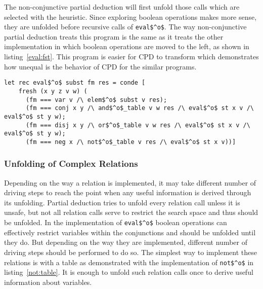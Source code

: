The non-conjunctive partial deduction will first unfold those calls which are selected with the heuristic.
Since exploring boolean operations makes more sense, they are unfolded before recursive calls of \lstinline{eval$^o$}.
The way non-conjunctive partial deduction treats this program is the same as it treats the other implementation in which boolean operations are moved to the left, as shown in listing~\ref{eval:fst}.
This program is easier for CPD to transform which demonstrates how unequal is the behavior of CPD for the similar programs.

\begin{figure*}[!h]
  \centering
  \begin{minipage}{0.85\textwidth}
    \begin{lstlisting}[label={eval:fst}, caption={Evaluator of formulas with boolean operation second}, captionpos=b, frame=tb]
  let rec eval$^o$ subst fm res = conde [
    fresh (x y z v w) (
      (fm === var v /\ elem$^o$ subst v res);
      (fm === conj x y /\ and$^o$_table v w res /\ eval$^o$ st x v /\ eval$^o$ st y w);
      (fm === disj x y /\ or$^o$_table v w res /\ eval$^o$ st x v /\ eval$^o$ st y w);
      (fm === neg x /\ not$^o$_table v res /\ eval$^o$ st x v))]
    \end{lstlisting}
  \end{minipage}
\end{figure*}

\subsubsection{Unfolding of Complex Relations}

Depending on the way a relation is implemented, it may take different number of driving steps to reach the point when any useful information is derived through its unfolding.
Partial deduction tries to unfold every relation call unless it is unsafe, but not all relation calls serve to restrict the search space and thus should be unfolded.
In the implementation of \lstinline{eval$^o$} boolean operations can effectively restrict variables within the conjunctions and should be unfolded until they do.
But depending on the way they are implemented, different number of driving steps should be performed to do so.
The simplest way to implement these relations is with a table as demonstrated with the implementation of \lstinline{not$^o$} in listing~\ref{not:table}.
It is enough to unfold such relation calls once to derive useful information about variables.

